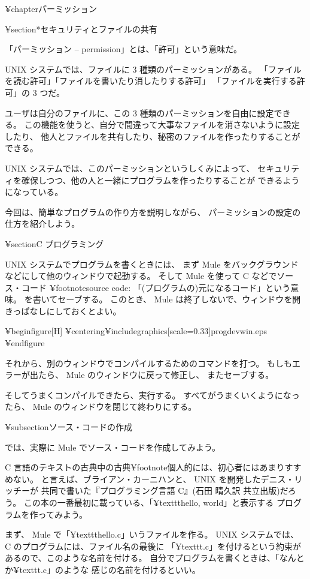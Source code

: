 ¥chapter{パーミッション}

¥section*{セキュリティとファイルの共有}

「パーミッション -- permission」とは、「許可」という意味だ。

 UNIX システムでは、ファイルに 3 種類のパーミッションがある。
「ファイルを読む許可」「ファイルを書いたり消したりする許可」
「ファイルを実行する許可」の 3 つだ。

ユーザは自分のファイルに、この 3 種類のパーミッションを自由に設定できる。
この機能を使うと、自分で間違って大事なファイルを消さないように設定したり、
他人とファイルを共有したり、秘密のファイルを作ったりすることができる。

 UNIX システムでは、このパーミッションというしくみによって、
セキュリティを確保しつつ、他の人と一緒にプログラムを作ったりすることが
できるようになっている。

今回は、簡単なプログラムの作り方を説明しながら、
パーミッションの設定の仕方を紹介しよう。

¥section{C プログラミング}

UNIX システムでプログラムを書くときには、
まず Mule をバックグラウンドなどにして他のウィンドウで起動する。
そして Mule を使って C などでソース・コード
¥footnote{source code: 「(プログラムの)元になるコード」という意味。}
を書いてセーブする。
このとき、 Mule は終了しないで、ウィンドウを開きっぱなしにしておくとよい。

¥begin{figure}[H]
¥centering{¥includegraphics[scale=0.33]{progdevwin.eps}}
¥end{figure}

それから、別のウィンドウでコンパイルするためのコマンドを打つ。
もしもエラーが出たら、 Mule のウィンドウに戻って修正し、
またセーブする。

そしてうまくコンパイルできたら、実行する。
すべてがうまくいくようになったら、 Mule のウィンドウを閉じて終わりにする。

¥subsection{ソース・コードの作成}

では、実際に Mule でソース・コードを作成してみよう。

 C 言語のテキストの古典中の古典¥footnote{個人的には、初心者にはあまりすすめない。}
と言えば、ブライアン・カーニハンと、 UNIX を開発したデニス・リッチーが
共同で書いた『プログラミング言語 C』(石田 晴久訳 共立出版)だろう。
この本の一番最初に載っている、「¥texttt{hello, world}」と表示する
プログラムを作ってみよう。

まず、 Mule で「¥texttt{hello.c}」いうファイルを作る。
 UNIX システムでは、 C のプログラムには、ファイル名の最後に
「¥texttt{.c}」を付けるという約束があるので、このような名前を付ける。
自分でプログラムを書くときは、「なんとか¥texttt{.c}」のような
感じの名前を付けるといい。

